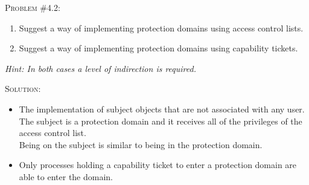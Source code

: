 \documentclass[12pt]{article}
\newenvironment{problem}[1]
{\begin{mdframed}[linewidth=0.8pt]
        \textsc{Problem #1:}

}
    {\end{mdframed}}
\newenvironment{solution}
    {\textsc{Solution:}\\}
    {\newpage}%
\begin{document}
	\begin{problem}{\#4.2}
		\begin{enumerate}[label=\alph*]
			\item Suggest a way of implementing protection domains using access control lists. 
			\item Suggest a way of implementing protection domains using capability tickets. 
		\end{enumerate}
		\textit{Hint: In both cases a level of indirection is required.}
	\end{problem}
	\begin{solution}
		\begin{itemize}[label=\alph*]
			\item The implementation of subject objects that are not associated with any user.
				\\
				The subject is a protection domain and it receives all of the privileges 
				of the access control list.
				\\
				Being on the subject is similar to being in the protection domain.
			\item Only processes holding a capability ticket to enter a protection
				domain are able to enter the domain.
		\end{itemize}	
	\end{solution}
\end{document}
